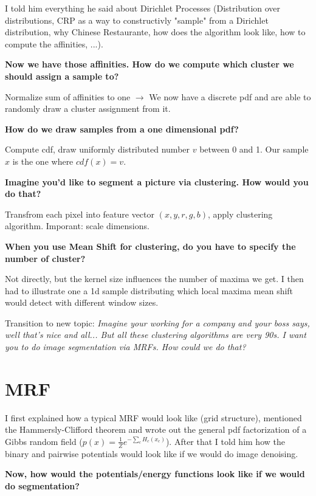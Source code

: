 \documentclass{scrartcl}
\begin{document}
I told him everything he said about Dirichlet Processes (Distribution over distributions, CRP as a way to constructivly "sample" from a Dirichlet distribution, why Chinese Restaurante, how does the algorithm look like, how to compute the affinities, ...).

\textbf{Now we have those affinities. How do we compute which cluster we should assign a sample to?}

Normalize sum of affinities to one \(\rightarrow\) We now have a discrete pdf and are able to randomly draw a cluster assignment from it.

\textbf{How do we draw samples from a one dimensional pdf?}

Compute cdf, draw uniformly distributed number \(v\) between 0 and 1. Our sample \(x\) is the one where \(cdf(x) = v\).

\textbf{Imagine you'd like to segment a picture via clustering. How would you do that?}

Transfrom each pixel into feature vector \((x, y, r, g, b)\), apply clustering algorithm. Imporant: scale dimensions.

\textbf{When you use Mean Shift for clustering, do you have to specify the number of cluster?}

Not directly, but the kernel size influences the number of maxima we get. I then had to illustrate one a 1d sample distributing which local maxima mean shift would detect with different window sizes.

\bigbreak

Transition to new topic: \textit{Imagine your working for a company and your boss says, well that's nice and all... But all these clustering algorithms are very 90s. I want you to do image segmentation via MRFs. How could we do that?}

\section{MRF}

I first explained how a typical MRF would look like (grid structure), mentioned the Hammersly-Clifford theorem and wrote out the general pdf factorization of a Gibbs random field (\(p(x) = \frac{1}{Z} e^{- \sum_c H_c(x_c)}\)). After that I told him how the binary and pairwise potentials would look like if we would do image denoising.

\textbf{Now, how would the potentials/energy functions look like if we would do segmentation?}
\end{document}
